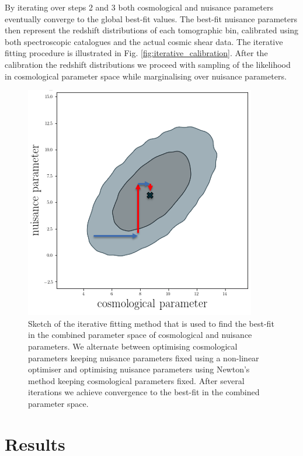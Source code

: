 \documentclass{aa}
\begin{document}
By iterating over steps 2 and 3 both cosmological and nuisance parameters eventually converge to the global best-fit values. The best-fit nuisance parameters then represent the redshift distributions of each tomographic bin, calibrated using both spectroscopic catalogues and the actual cosmic shear data. The iterative fitting procedure is illustrated in Fig. \ref{fig:iterative_calibration}. After the calibration the redshift distributions we proceed with sampling of the likelihood in cosmological parameter space while marginalising over nuisance parameters.
\begin{figure}
\label{fig:iterative_calibration}
\centering
\includegraphics[scale=0.4]{plots/iterative.png}
\caption{Sketch of the iterative fitting method that is used to find the best-fit in the combined parameter space of cosmological and nuisance parameters. We alternate between optimising cosmological parameters keeping nuisance parameters fixed using a non-linear optimiser and optimising nuisance parameters using Newton's method keeping cosmological parameters fixed. After several iterations we achieve convergence to the best-fit in the combined parameter space.}
\label{fig:comb}
\end{figure}
\section{Results}
\label{sec:results}
\end{document}
